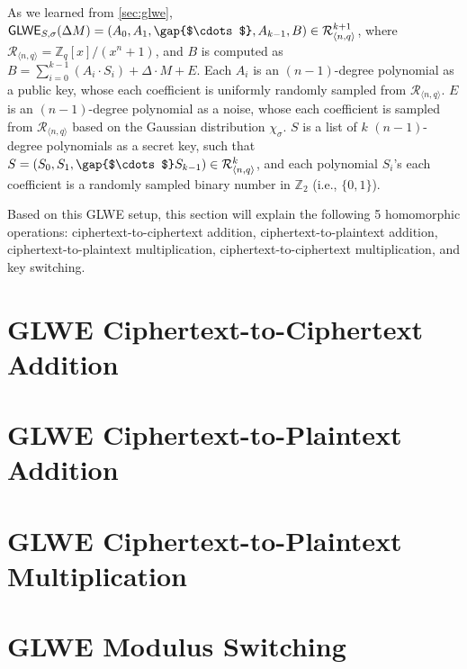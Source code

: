 \documentclass[11pt]{article}
\begin{document}
As we learned from \autoref{sec:glwe}, $\textsf{GLWE}_{S,\sigma}(\Delta M) = (A_0, A_1, \gap{$\cdots$} , A_{k-1}, B) \in \mathcal{R}_{\langle n, q \rangle }^{k + 1}$, where $\mathcal{R}_{\langle n,q \rangle} = \mathbb{Z}_q[x] / (x^n + 1)$, and $B$ is computed as $B = \sum\limits_{i=0}^{k-1}{(A_i \cdot S_i)} + \Delta \cdot M + E$. Each $A_i$ is an $(n-1)$-degree polynomial as a public key, whose each coefficient is uniformly randomly sampled from $\mathcal{R}_{\langle n, q \rangle }$. $E$ is an $(n-1)$-degree polynomial as a noise, whose each coefficient is sampled from $\mathcal{R}_{\langle n, q \rangle }$ based on the Gaussian distribution $\chi_\sigma$. $S$ is a list of $k$ $(n-1)$-degree polynomials as a secret key, such that $S = (S_0, S_1, \gap{$\cdots$} S_{k-1} ) \in \mathcal{R}_{\langle n, q \rangle }^k$, and each polynomial $S_i$'s each coefficient is a randomly sampled binary number in $\mathbb{Z}_2$ (i.e., $\{0, 1\}$). 

Based on this GLWE setup, this section will explain the following 5 homomorphic operations: ciphertext-to-ciphertext addition, ciphertext-to-plaintext addition, ciphertext-to-plaintext multiplication, ciphertext-to-ciphertext multiplication, and key switching. 


\clearpage


\section{GLWE Ciphertext-to-Ciphertext Addition}
\label{sec:glwe-add-cipher}


\clearpage

\section{GLWE Ciphertext-to-Plaintext Addition}
\label{sec:glwe-add-plain}


\clearpage

\section{GLWE Ciphertext-to-Plaintext Multiplication}
\label{sec:glwe-mult-plain}


\clearpage

\section{GLWE Modulus Switching}
\label{sec:modulus-switching}

\end{document}
